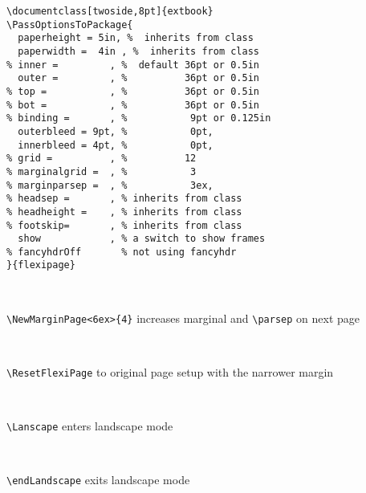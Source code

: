 \documentclass[twoside,8pt]{extarticle}
\begin{document}
\begin{verbatim}
\documentclass[twoside,8pt]{extbook}
\PassOptionsToPackage{
  paperheight = 5in, %  inherits from class
  paperwidth =  4in , %  inherits from class
% inner =         , %  default 36pt or 0.5in
  outer =         , %          36pt or 0.5in
% top =           , %          36pt or 0.5in
% bot =           , %          36pt or 0.5in
% binding =       , %           9pt or 0.125in
  outerbleed = 9pt, %           0pt,
  innerbleed = 4pt, %           0pt,
% grid =          , %          12
% marginalgrid =  , %           3
% marginparsep =  , %           3ex,
% headsep =       , % inherits from class
% headheight =    , % inherits from class
% footskip=       , % inherits from class
  show            , % a switch to show frames
% fancyhdrOff       % not using fancyhdr
}{flexipage}
\end{verbatim}
\footnotesize

         \lipsum[10][1-3] \marginpar[{\itshape\tiny\lipsum[1][1-4]}]{\itshape\tiny\lipsum[8]} 

         \lipsum[2] \marginpar[{\itshape\tiny\lipsum[1][1-4]}]{\itshape\tiny\lipsum[8][1-5]}

         \lipsum[2][1-6]

~

{\normalsize
\noindent\verb"\NewMarginPage<6ex>{4}" increases marginal and \verb"\parsep" on next page}

         \lipsum[3][1-3]  \marginpar[{\itshape\tiny\lipsum[1][1-4]}]{\itshape\tiny\lipsum[10][1-4]}

         \lipsum[1][1-8]

       \lipsum[2][1-7]

~

{\normalsize
\noindent\verb"\ResetFlexiPage" to original page setup with the narrower margin}
\ResetFlexiPage

         \lipsum[10][1-5] \marginpar[{\itshape\tiny\lipsum[1][1-4]}]{\itshape\tiny\lipsum[1][1-3]} \lipsum[2]

~

{\normalsize
\noindent\verb"\Lanscape" enters landscape mode}
\begin{Landscape} %

         \lipsum[1-4]

~

{\normalsize
\noindent\verb"\endLandscape" exits landscape mode }
\end{Landscape} %
         \lipsum[2][1-5] \marginpar[{\itshape\tiny\lipsum[1][1-4]}]{\itshape\tiny\lipsum[1][1-3]} \lipsum[11]
         
\end{document}
